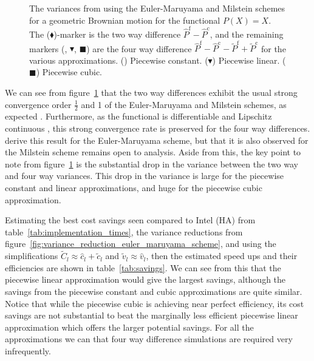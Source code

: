 \documentclass[manuscript,review]{acmart}
\begin{document}
\begin{figure}[htb]
\centering

\hfill
{}\hfill 
{}\hfill

\caption{The variances from using the Euler-Maruyama and Milstein schemes for a geometric Brownian motion for the functional $ P(X) = X $. The ($ \blacklozenge $)-marker is the two way difference $ \hat{P}^{\mathrm{f}} - \hat{P}^{\mathrm{c}} $, and the remaining markers (\raisebox{-0.1em}{\huge$ \bullet$}, {\large $ \blacktriangledown $}, $ \blacksquare $) are the four way difference $ \hat{P}^{\mathrm{f}} - \hat{P}^{\mathrm{c}} - \tilde{P}^{\mathrm{f}} + \tilde{P}^{\mathrm{c}} $ for the various approximations. (\raisebox{-0.1em}{\huge$ \bullet$}) Piecewise constant. ({\large $ \blacktriangledown $}) Piecewise linear. ($ \blacksquare $) Piecewise cubic.}
\label{fig:variance_reduction}
\end{figure}

We can see from figure~\ref{fig:variance_reduction} that the two way differences exhibit the usual strong convergence order $ \tfrac{1}{2} $ and 1 of the Euler-Maruyama and Milstein schemes, as expected \citep{kloeden1999numerical}. Furthermore, as the functional is differentiable and Lipschitz continuous \citep{giles2020approximate,sheridan2020nested}, this strong convergence rate is preserved for the four way differences. \citeauthor{giles2020approximate} \citep{giles2020approximate,sheridan2020nested} derive this result for the Euler-Maruyama scheme, but that it is also observed for the Milstein scheme remains open to analysis. Aside from this, the key point to note from figure~\ref{fig:variance_reduction} is the substantial drop in the variance between the two way and four way variances. This drop in the variance is large for the piecewise constant and linear approximations, and huge for the piecewise cubic approximation. 

Estimating the best cost savings seen compared to Intel (HA) from table~\ref{tab:implementation_times}, the variance reductions from figure~\ref{fig:variance_reduction_euler_maruyama_scheme}, and using the simplifications $ \tilde{C}_l \approx \hat{c}_l + \tilde{c}_l $ and $ \tilde{v}_l \approx  \hat{v}_l $, then the estimated speed ups and their efficiencies are shown in table~\ref{tab:savings}. We can see from this that the piecewise linear approximation would give the largest savings, although the savings from the piecewise constant and cubic approximations are quite similar. Notice that while the piecewise cubic is achieving near perfect efficiency, its cost savings are not substantial to beat the marginally less efficient piecewise linear approximation which offers the larger potential savings. For all the approximations we can that four way difference simulations are required very infrequently. 
\end{document}
